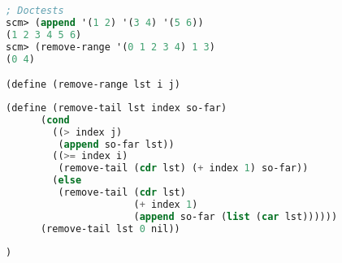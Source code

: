 \begin{lstlisting}[language=Scheme]
; Doctests
scm> (append '(1 2) '(3 4) '(5 6))
(1 2 3 4 5 6)
scm> (remove-range '(0 1 2 3 4) 1 3)
(0 4)

(define (remove-range lst i j)

\end{lstlisting}
\begin{solution}[1.5in]
\begin{lstlisting}[language=Scheme]
    (define (remove-tail lst index so-far)
      (cond
        ((> index j)
         (append so-far lst))
        ((>= index i)
         (remove-tail (cdr lst) (+ index 1) so-far))
        (else
         (remove-tail (cdr lst)
                      (+ index 1)
                      (append so-far (list (car lst))))))
      (remove-tail lst 0 nil))
\end{lstlisting}
\end{solution}
\begin{lstlisting}[language=Scheme]
)
\end{lstlisting}
